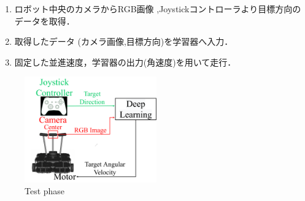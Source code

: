 \documentclass[10pt]{jarticle}
\begin{document}
    \begin{enumerate}
    \setlength{\parskip}{0cm} %
    \setlength{\itemsep}{0cm} %
    \item ロボット中央のカメラからRGB画像 ,Joystickコントローラより目標方向のデータを取得．
    \item 取得したデータ (カメラ画像,目標方向)を学習器へ入力．
    \item 固定した並進速度，学習器の出力(角速度)を用いて走行．
    \end{enumerate}
    \begin{center}
        \begin{figure}[h]
            \centering
            \includegraphics[width=5.7cm]{./fig/system_test.pdf}
            \caption{Test phase}
            \label{fig:system_test}
        \end{figure}
    \end{center}
    \vspace{-1zh}
\end{document}
